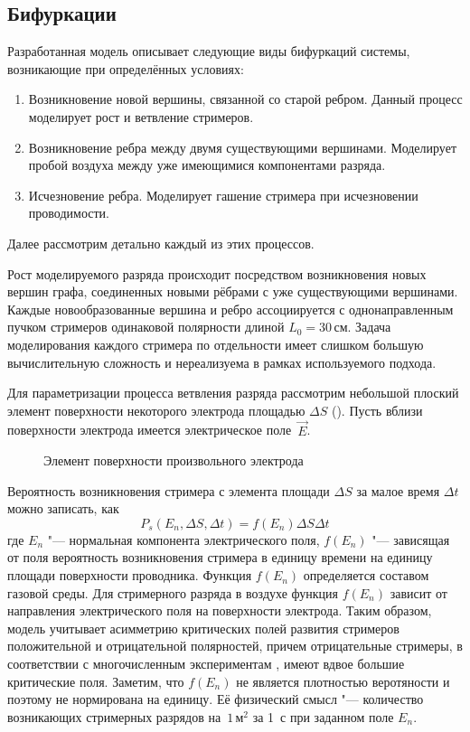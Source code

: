 \subsection{Бифуркации}
\label{sect:bifurcations}
Разработанная модель описывает следующие виды бифуркаций системы, возникающие при определённых условиях:
\begin{enumerate}
	\item Возникновение новой вершины, связанной со старой ребром. Данный процесс моделирует рост и ветвление стримеров.\label{emun:bif-new}
	\item Возникновение ребра между двумя существующими вершинами. Моделирует пробой воздуха между уже имеющимися компонентами разряда.\label{emun:bif-connect}
	\item Исчезновение ребра. Моделирует гашение стримера при исчезновении проводимости.\label{emun:bif-remove}
\end{enumerate}
Далее рассмотрим детально каждый из этих процессов. 

 Рост моделируемого разряда происходит посредством возникновения новых вершин графа, соединенных новыми рёбрами с уже существующими вершинами. Каждые новообразованные вершина и ребро ассоциируется с однонаправленным пучком стримеров одинаковой полярности длиной $L_0 = 30\,\text{см}$. Задача моделирования каждого стримера по отдельности имеет слишком большую вычислительную сложность и нереализуема в рамках используемого подхода.

Для параметризации процесса ветвления разряда рассмотрим небольшой плоский элемент поверхности некоторого электрода площадью $\Delta S$ (). Пусть вблизи поверхности электрода имеется электрическое поле~$\vec E$. 
\begin{figure}[h]
	\caption{Элемент поверхности произвольного электрода}
	\label{fig:electode}
\end{figure}

Вероятность возникновения стримера с элемента площади $\Delta S$ за малое время $\Delta t$ можно записать, как
\begin{equation}
	P_s(E_n, \Delta S, \Delta t) = f(E_n)\Delta S \Delta t
	\label{eq:prob-deltas}
\end{equation}
где $E_n$ "--- нормальная компонента электрического поля, $f(E_n)$ "--- зависящая от поля вероятность возникновения стримера в единицу времени на единицу площади поверхности проводника. Функция $f(E_n)$ определяется составом газовой среды. Для стримерного разряда в воздухе функция $f(E_n)$ зависит от направления электрического поля на поверхности электрода. Таким образом, модель учитывает асимметрию критических полей развития стримеров положительной и отрицательной полярностей, причем отрицательные стримеры, в соответствии с многочисленным экспериментам \cite{Bazelyan1997}, имеют вдвое большие критические поля. Заметим, что $f(E_n)$ не является плотностью веротяности и поэтому не нормирована на единицу. Её физический смысл "--- количество возникающих стримерных разрядов на~$1\,\text{м}^2$ за 1~с при заданном поле $E_n$.

